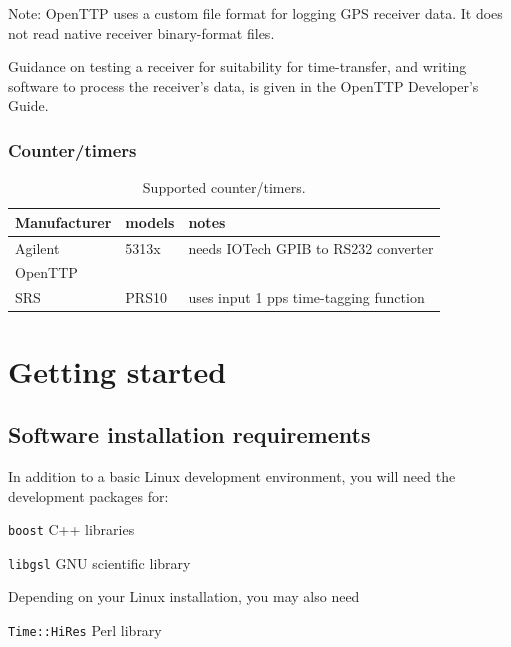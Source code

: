 \documentclass[11pt,a4paper,openany,oneside]{book}
\newcommand{\cc}[1]{{\texttt{#1}}}
\newenvironment{description*}%
  {\setlength{\parskip}{0pt}%
	 \begin{description}%
		\setlength{\topsep}{-12pt}%
		\setlength{\itemindent}{-12pt}%
    \setlength{\itemsep}{0pt}%
		\setlength{\itemsep}{0pt}}%
  {\end{description}}
\begin{document}
	Note: OpenTTP uses a custom file format for logging GPS receiver data. It does not read native receiver binary-format files.
	
	Guidance on testing a receiver for suitability for time-transfer, and writing software to process
	the receiver's data, is given in the OpenTTP Developer's Guide.
	
	\subsection{Counter/timers}
	
	\begin{table}
	\begin{tabular}{lll}
	Manufacturer & models & notes \\ \hline
	Agilent & 5313x &  needs IOTech GPIB to RS232 converter\\
	OpenTTP &  & \\
	SRS & PRS10 & uses input 1 pps time-tagging function\\
	\end{tabular}
	\caption{Supported counter/timers.}
	\end{table}
	
\chapter{Getting started}

\section{Software installation requirements}

In addition to a basic Linux development environment, you will need the development packages for:
\begin{description*}
	\item[\cc{boost}]  C++ libraries
	\item[\cc{libgsl}] GNU scientific library
\end{description*}

Depending on your Linux installation, you may also need
\begin{description*}
	\item[\cc{Time::HiRes}] Perl library
\end{description*}
\end{document}

